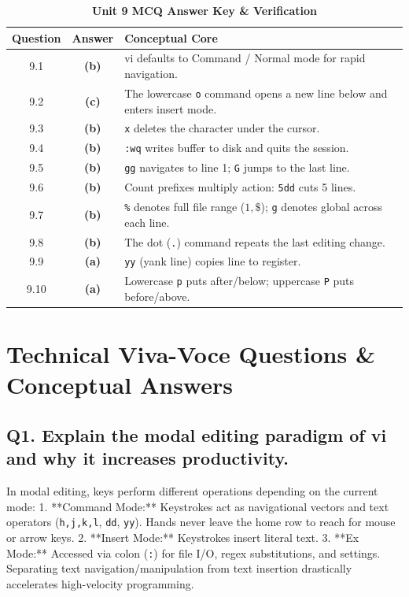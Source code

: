 \begin{table}[htbp]
\centering
\caption{\textbf{Unit 9 MCQ Answer Key \& Verification}}
\begin{tabularx}{0.85\linewidth}{c c X}
\toprule
\textbf{Question} & \textbf{Answer} & \textbf{Conceptual Core} \\
\midrule
9.1 & \textbf{(b)} & vi defaults to Command / Normal mode for rapid navigation. \\
9.2 & \textbf{(c)} & The lowercase \texttt{o} command opens a new line below and enters insert mode. \\
9.3 & \textbf{(b)} & \texttt{x} deletes the character under the cursor. \\
9.4 & \textbf{(b)} & \texttt{:wq} writes buffer to disk and quits the session. \\
9.5 & \textbf{(b)} & \texttt{gg} navigates to line 1; \texttt{G} jumps to the last line. \\
9.6 & \textbf{(b)} & Count prefixes multiply action: \texttt{5dd} cuts 5 lines. \\
9.7 & \textbf{(b)} & \texttt{\%} denotes full file range ($1,\$$); \texttt{g} denotes global across each line. \\
9.8 & \textbf{(b)} & The dot (\texttt{.}) command repeats the last editing change. \\
9.9 & \textbf{(a)} & \texttt{yy} (yank line) copies line to register. \\
9.10 & \textbf{(a)} & Lowercase \texttt{p} puts after/below; uppercase \texttt{P} puts before/above. \\
\bottomrule
\end{tabularx}
\end{table}

\section{Technical Viva-Voce Questions \& Conceptual Answers}

\subsection*{Q1. Explain the modal editing paradigm of vi and why it increases productivity.}
\begin{vivasol}
In modal editing, keys perform different operations depending on the current mode:
1. **Command Mode:** Keystrokes act as navigational vectors and text operators (\texttt{h,j,k,l}, \texttt{dd}, \texttt{yy}). Hands never leave the home row to reach for mouse or arrow keys.
2. **Insert Mode:** Keystrokes insert literal text.
3. **Ex Mode:** Accessed via colon (\texttt{:}) for file I/O, regex substitutions, and settings.
Separating text navigation/manipulation from text insertion drastically accelerates high-velocity programming.
\end{vivasol}

